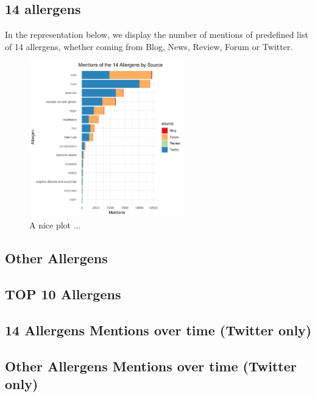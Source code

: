 \subsection{14 allergens}

In the representation below, we display the number of mentions of predefined list of 14 allergens, whether coming from Blog, News, Review, Forum or Twitter.

\begin{figure}
  \centering
  \includegraphics[width=0.6\textwidth]{figures/Dataset1/14_allergens_bysource.png}
  \caption{A nice plot ...}
\end{figure}

\subsection{Other Allergens}

\subsection{TOP 10 Allergens}

\subsection{14 Allergens Mentions over time (Twitter only)}

\subsection{Other Allergens Mentions over time (Twitter only)}
